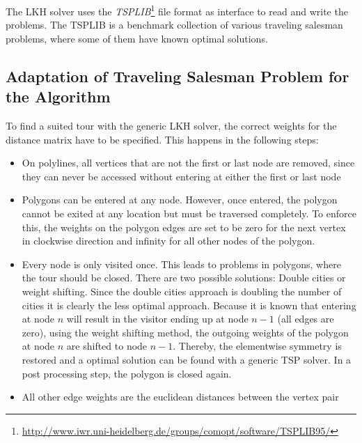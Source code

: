 The LKH solver uses the \textit{TSPLIB}\footnote{\url{http://www.iwr.uni-heidelberg.de/groups/comopt/software/TSPLIB95/}} file format as interface to read and write the problems. The TSPLIB is a benchmark collection of various traveling salesman problems, where some of them have known optimal solutions.

\subsection{Adaptation of Traveling Salesman Problem for the Algorithm}

To find a suited tour with the generic LKH solver, the correct weights for the distance matrix have to be specified. This happens in the following steps:

\begin{itemize}
\item On polylines, all vertices that are not the first or last node are removed, since they can never be accessed without entering at either the first or last node 
\item Polygons can be entered at any node. However, once entered, the polygon cannot be exited at any location but must be traversed completely. To enforce this, the weights on the polygon edges are set to be zero for the next vertex in clockwise direction and infinity for all other nodes of the polygon.
\item Every node is only visited once. This leads to problems in polygons, where the tour should be closed. There are two possible solutions: Double cities or weight shifting. Since the double cities approach is doubling the number of cities it is clearly the less optimal approach. Because it is known that entering at node $n$ will result in the visitor ending up at node $n-1$ (all edges are zero), using the weight shifting method, the outgoing weights of the polygon at node $n$ are shifted to node $n-1$. Thereby, the elementwise symmetry is restored and a optimal solution can be found with a generic TSP solver. In a post processing step, the polygon is closed again.
\item All other edge weights are the euclidean distances between the vertex pair
\end{itemize}

